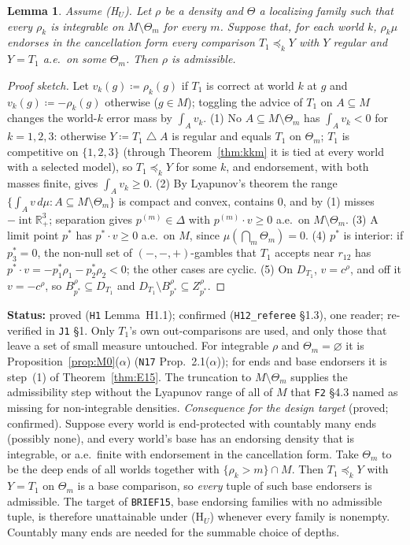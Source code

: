 \documentclass[11pt]{article}
\newtheorem{lemma}[theorem]{Lemma}
\theoremstyle{definition}
\theoremstyle{remark}
\newcommand{\R}{\mathbb R}
\newcommand{\sd}{\mathbin{\triangle}}
\newcommand{\src}[1]{\texttt{#1}}
\newcommand{\status}[1]{\par\smallskip\noindent\textbf{Status:} #1\par\smallskip}
\begin{document}
\begin{lemma}\label{lem:H11}
Assume (H$_U$). Let $\rho$ be a density and $\Theta$ a localizing family such that every $\rho_k$ is integrable on $M\setminus\Theta_m$ for every $m$. Suppose that, for each world $k$, $\rho_k\mu$ endorses in the cancellation form every comparison $T_1\preceq_kY$ with $Y$ regular and $Y=T_1$ a.e.\ on some $\Theta_m$. Then $\rho$ is admissible.
\end{lemma}
\begin{proof}[Proof sketch]
Let $v_k(g)\coloneqq\rho_k(g)$ if $T_1$ is correct at world $k$ at $g$ and $v_k(g)\coloneqq-\rho_k(g)$ otherwise ($g\in M$); toggling the advice of $T_1$ on $A\subseteq M$ changes the world-$k$ error mass by $\int_Av_k$. (1) No $A\subseteq M\setminus\Theta_m$ has $\int_Av_k<0$ for $k=1,2,3$: otherwise $Y\coloneqq T_1\sd A$ is regular and equals $T_1$ on $\Theta_m$; $T_1$ is competitive on $\{1,2,3\}$ (through Theorem~\ref{thm:kkm} it is tied at every world with a selected model), so $T_1\preceq_kY$ for some $k$, and endorsement, with both masses finite, gives $\int_Av_k\ge0$. (2) By Lyapunov's theorem the range $\{\int_Av\,d\mu:A\subseteq M\setminus\Theta_m\}$ is compact and convex, contains $0$, and by (1) misses $-\operatorname{int}\R^3_+$; separation gives $p^{(m)}\in\Delta$ with $p^{(m)}\cdot v\ge0$ a.e.\ on $M\setminus\Theta_m$. (3) A limit point $p^*$ has $p^*\cdot v\ge0$ a.e.\ on $M$, since $\mu(\bigcap_m\Theta_m)=0$. (4) $p^*$ is interior: if $p^*_3=0$, the non-null set of $(-,-,+)$-gambles that $T_1$ accepts near $r_{12}$ has $p^*\cdot v=-p^*_1\rho_1-p^*_2\rho_2<0$; the other cases are cyclic. (5) On $D_{T_1}$, $v=c^\rho$, and off it $v=-c^\rho$, so $B^\rho_{p^*}\subseteq D_{T_1}$ and $D_{T_1}\setminus B^\rho_{p^*}\subseteq Z^\rho_{p^*}$.
\end{proof}
\status{proved (\src{H1} Lemma~H1.1); confirmed (\src{H12\_referee} \S1.3), one reader; re-verified in \src{J1} \S1. Only $T_1$'s own out-comparisons are used, and only those that leave a set of small measure untouched. For integrable $\rho$ and $\Theta_m=\varnothing$ it is Proposition~\ref{prop:M0}($\alpha$) (\src{N17} Prop.~2.1($\alpha$)); for ends and base endorsers it is step~(1) of Theorem~\ref{thm:E15}. The truncation to $M\setminus\Theta_m$ supplies the admissibility step without the Lyapunov range of all of $M$ that \src{F2} \S4.3 named as missing for non-integrable densities. \emph{Consequence for the design target} (proved; confirmed). Suppose every world is end-protected with countably many ends (possibly none), and every world's base has an endorsing density that is integrable, or a.e.\ finite with endorsement in the cancellation form. Take $\Theta_m$ to be the deep ends of all worlds together with $\{\rho_k>m\}\cap M$. Then $T_1\preceq_kY$ with $Y=T_1$ on $\Theta_m$ is a base comparison, so \emph{every} tuple of such base endorsers is admissible. The target of \src{BRIEF15}, base endorsing families with no admissible tuple, is therefore unattainable under (H$_U$) whenever every family is nonempty. Countably many ends are needed for the summable choice of depths.}
\end{document}

